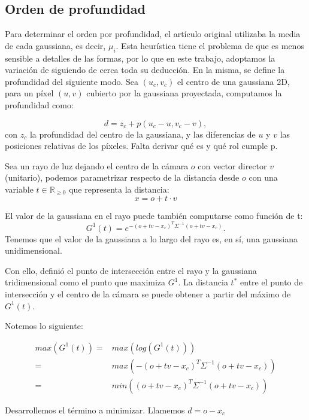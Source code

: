 \subsection{Orden de profundidad}

Para determinar el orden por profundidad, el artículo original \cite{kerbl2023gaussian} utilizaba la media de cada gaussiana, es decir, $\mu_i$. Esta heurística tiene el problema de que es menos sensible a detalles de las formas, por lo que en este trabajo, adoptamos la variación de \cite{zhang2024radegs} siguiendo de cerca toda su deducción. En la misma, se define la profundidad del siguiente modo. Sea $(u_c, v_c)$ el centro de una gaussiana 2D, para un píxel $(u,v)$ cubierto por la gaussiana proyectada, computamos la profundidad como:

\begin{equation}
d = z_c + p (u_c - u, v_c - v),
\label{profundidad_gaussianas}
\end{equation}
con $z_c$ la profundidad del centro de la gaussiana, y las diferencias de $u$ y $v$ las posiciones relativas de los píxeles. Falta derivar qué es y qué rol cumple p.

Sea un rayo de luz dejando el centro de la cámara $o$ con vector director $v$ (unitario), podemos parametrizar respecto de la distancia desde $o$ con una variable $t \in \mathbb{R}_{\geq 0}$ que representa la distancia:
$$
x = o + t \cdot v
$$

El valor de la gaussiana en el rayo puede también computarse como función de t:
$$
G^1(t) = e^{-(o+tv-x_c)^T \Sigma^{-1} (o+tv-x_c)}.
$$
Tenemos que el valor de la gaussiana a lo largo del rayo es, en sí, una gaussiana unidimensional.

Con ello, \cite{zhang2024radegs} definió el punto de intersección entre el rayo y la gaussiana tridimensional como el punto que maximiza $G^1$. La distancia $t^*$ entre el punto de intersección y el centro de la cámara se puede obtener a partir del máximo de $G^1(t)$.

Notemos lo siguiente:


\begin{align*}
max(G^1(t)) =& max(log(G^1(t))) \\ 
            =& max(-(o+tv-x_c)^T\Sigma^{-1}(o+tv-x_c)) \\
            =& min((o+tv-x_c)^T\Sigma^{-1}(o+tv-x_c))
\end{align*}


Desarrollemos el término a minimizar. Llamemos $d = o - x_c$

